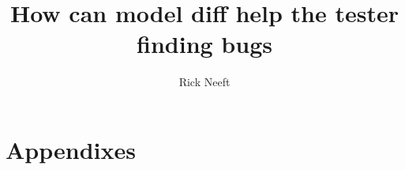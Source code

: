 \documentclass{ou-report-vaf}
\author{Rick Neeft}
\title{How can model diff help the tester finding bugs}
\begin{document}
    
    
    \tableofcontents
    \newpage
    
    \printnoidxglossary[type=\acronymtype]
    \newpage
    
    
    \newpage
    
    
    \newpage
    
    
    \newpage
    
    
    \newpage
    
    
    \newpage
    
    \appendix
    \chapter{Appendixes}
    
    \newpage

    
    
\end{document}
